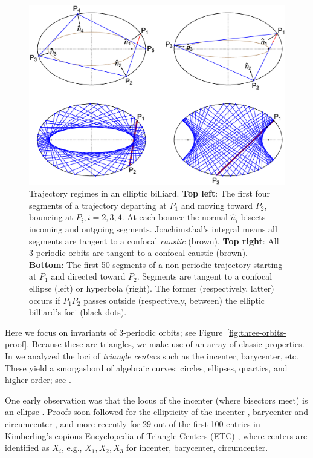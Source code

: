 \documentclass{article}
\theoremstyle{definition}
\begin{document}
\begin{figure}[H]
    \centering
    \includegraphics[width=.8\textwidth]{1010_billiard_trajectories.eps}
    \caption{Trajectory regimes in an elliptic billiard. \textbf{Top left}: The first four segments of a trajectory departing at $P_1$ and moving toward $P_2$, bouncing at $P_i, i=2,3,4$. At each bounce the normal $\hat{n}_i$ bisects incoming and outgoing segments. Joachimsthal's integral \cite{sergei91} means all segments are tangent to a confocal {\em caustic} (brown). \textbf{Top right}: All 3-periodic orbits are tangent to a confocal caustic (brown). \textbf{Bottom}: The first 50 segments of a non-periodic trajectory starting at $P_1$ and directed toward $P_2$. Segments are tangent to a confocal ellipse (left) or hyperbola (right). The former (respectively, latter) occurs if $P_1P_2$ passes outside (respectively, between) the elliptic billiard's foci (black dots).}
    \label{fig:billiard-trajectories}
\end{figure}

Here we focus on invariants of 3-periodic orbits; see Figure~\ref{fig:three-orbits-proof}. Because these  are triangles, we make use of an array of classic properties. In \cite{reznik2019-intelligencer,reznik2020-loci} we analyzed the loci of {\em triangle centers} \cite{kimberling97-major-centers} such as the incenter, barycenter, etc. These yield a smorgasbord of algebraic curves: circles, ellipses, quartics, and higher order; see \cite{reznik2019-locus-gallery}.

One early observation was that the locus of the incenter (where bisectors meet) is an ellipse \cite[PL\#01]{reznik2020-playlist-proofs}. Proofs soon followed for the ellipticity of the incenter \cite{olga14}, barycenter \cite{sergei07_grid} and circumcenter \cite{corentin19,garcia2019-ellipses}, and more recently \cite{reznik2020-loci} for 29 out of the first 100 entries in Kimberling's copious Encyclopedia of Triangle Centers (ETC) \cite{etc}, where centers are identified as $X_i$, e.g., $X_1,X_2,X_3$ for incenter, barycenter, circumcenter.
\end{document}
